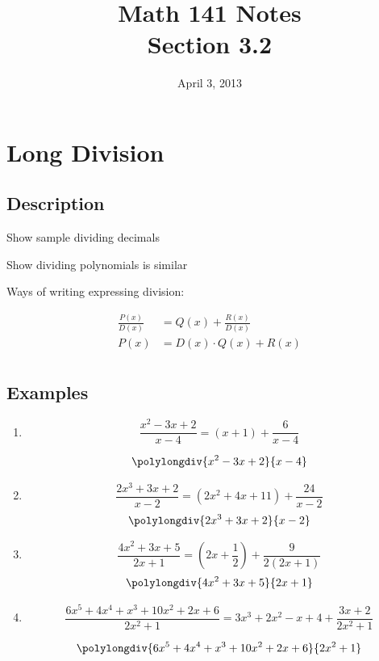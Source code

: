 \documentclass{exam}
\title{Math 141 Notes \\ Section 3.2}
\date{April 3, 2013}
\begin{document}
  \maketitle
  \tableofcontents

  \section{Long Division}
  \subsection{Description}

  \begin{itemize*}
    \item Show sample dividing decimals
    \item Show dividing polynomials is similar
  \end{itemize*}

  Ways of writing expressing division:

  \begin{align*}
    \frac{P(x)}{D(x)} &= Q(x) + \frac{R(x)}{D(x)} \\
    P(x)              &= D(x) \cdot Q(x) + R(x) \\
  \end{align*}

  \subsection{Examples}

  \begin{enumerate}

    \item 
      \[ \frac{x^2 - 3x + 2}{x - 4} = (x + 1) + \frac{6}{x - 4} \]

      \[ \polylongdiv{x^2 - 3x + 2}{x - 4} \]

    \item 
      \[ \frac{2x^3 + 3x + 2}{x - 2} = (2x^2 + 4x + 11) + \frac{24}{x - 2} \]
      \[ \polylongdiv{2x^3 + 3x + 2}{x - 2} \]

    \item 
      \[ \frac{4x^2 + 3x + 5}{2x + 1} = \left( 2x + \frac{1}{2} \right) + \frac{9}{2(2x + 1)} \]
      \[ \polylongdiv{4x^2 + 3x + 5}{2x + 1} \]

    \pagebreak

    \item 
      \[ \frac{6x^5 + 4x^4 + x^3 + 10x^2 + 2x + 6}{2x^2 + 1} = 3x^3 + 2x^2 - x + 4 + \frac{3x + 2}{2x^2 + 1} \]

      \[ \polylongdiv{6x^5 + 4x^4 + x^3 + 10x^2 + 2x + 6}{2x^2 + 1} \]

  \end{enumerate}
\end{document}
